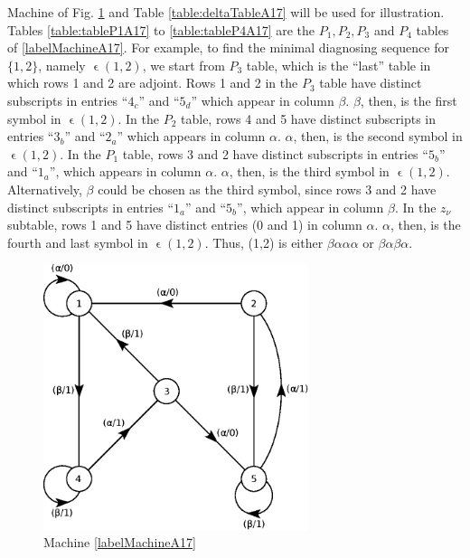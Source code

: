     \setcounter{machineNumber}{16}
    \incSampleMachine
    Machine \sampleMachine \label{labelMachineA17} of Fig. \ref{fig:machineA17}  and Table \ref{table:deltaTableA17} will be used for illustration. Tables \ref{table:tableP1A17} to \ref{table:tableP4A17} are the $P_1, P_2, P_3$ and $P_4$ tables of \ref{labelMachineA17}. For example, to find the minimal diagnosing sequence for $\{1,2\}$, namely $ \upvarepsilon( 1, 2 )$, we start from $P_3$ table, which is the ``last'' table in which rows 1 and 2 are adjoint. Rows 1 and 2 in the $P_3$ table have distinct subscripts in entries ``$4_c$'' and ``$5_d$'' which appear in column $\beta$. $\beta$, then, is the first symbol in $\upvarepsilon(1,2)$. In the $P_2$ table, rows 4 and 5 have distinct subscripts in entries ``$3_b$'' and ``$2_a$'' which appears in column $\alpha$. $\alpha$, then, is the second symbol in $\upvarepsilon(1,2)$. In the $P_1$ table, rows 3 and 2 have distinct subscripts in entries ``$5_b$'' and ``$1_a$'', which appears in column $\alpha$. $\alpha$, then, is the third symbol in $\upvarepsilon(1,2)$. Alternatively, $\beta$ could be chosen as the third symbol, since rows 3 and 2 have distinct subscripts in entries ``$1_a$'' and ``$5_b$'',  which appear in column $\beta$. In the $z_\nu$ subtable, rows 1 and 5 have distinct entries (0 and 1) in column $\alpha$. $\alpha$, then, is the fourth and last symbol in $\upvarepsilon(1,2)$. Thus, (1,2) is either $\beta\alpha\alpha\alpha$ or $\beta\alpha\beta\alpha$.
\begin{figure}[h]
    \centering
    \includegraphics[width=220pt,clip]{images/eps/machineA17}
    \caption{Machine \ref{labelMachineA17}}
    \label{fig:machineA17}
\end{figure}
